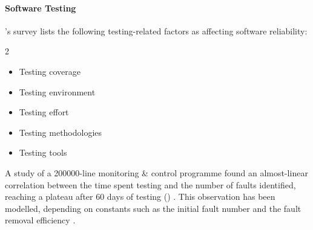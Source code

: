 \documentclass[a4paper,nobib,justified,final]{tufte-book}
\begin{document}
\paragraph{Software Testing}
\citeauthor{zhuComparisonAnalysisEnvironmental2015}'s survey lists the following testing-related factors as affecting software reliability: \autocite{zhuComparisonAnalysisEnvironmental2015}
\begin{multicols}{2}
\begin{itemize}[itemsep=-2ex]
	\item Testing coverage
	\item Testing environment
	\item Testing effort
	\item Testing methodologies
	\item Testing tools
\end{itemize}
\end{multicols}

A \citeyear{tohmaEstimationParametersHypergeometric1991} study of a \num{200000}-line monitoring \& control programme found an almost-linear correlation between the time spent testing and the number of faults identified, reaching a plateau after 60 days of testing () \autocite{tohmaEstimationParametersHypergeometric1991}. This observation has been modelled, depending on constants such as the initial fault number and the fault removal efficiency \autocite{liTestingcoverageSoftwareReliability2017}.
\end{document}
